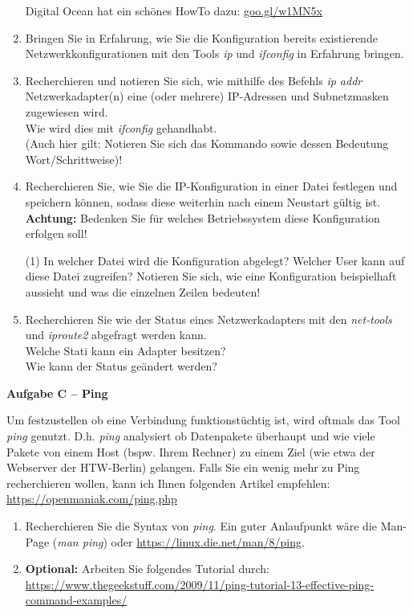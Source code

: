 \documentclass[paper=a4,fontsize=11pt]{scrartcl}%
\numberwithin{equation}{section}
\begin{document}
\begin{enumerate}
	Digital Ocean hat ein schönes HowTo dazu: \url{goo.gl/w1MN5x}
 	\item Bringen Sie in Erfahrung, wie Sie die Konfiguration bereits existierende Netzwerkkonfigurationen mit den Tools \emph{ip} und \emph{ifconfig} in Erfahrung bringen.
	\item Recherchieren und notieren Sie sich, wie mithilfe des Befehls \emph{ip addr} Netzwerkadapter(n) eine (oder mehrere) IP-Adressen und Subnetzmasken zugewiesen wird.\\
	Wie wird dies mit \emph{ifconfig} gehandhabt.\\
	(Auch hier gilt: Notieren Sie sich das Kommando sowie dessen Bedeutung Wort/Schrittweise)!
	\item Recherchieren Sie, wie Sie die IP-Konfiguration in einer Datei festlegen und speichern können, sodass diese weiterhin nach einem Neustart gültig ist.\\
	\textbf{Achtung:} Bedenken Sie für welches Betriebssystem diese Konfiguration erfolgen soll!
	\begin{tasks}(1)
		\task In welcher Datei wird die Konfiguration abgelegt?
		\task Welcher User kann auf diese Datei zugreifen?
		\task Notieren Sie sich, wie eine Konfiguration beispielhaft aussieht und was die einzelnen Zeilen bedeuten!
	\end{tasks}
	\item Recherchieren Sie wie der Status eines Netzwerkadapters mit den \emph{net-tools} und \emph{iproute2} abgefragt werden kann.\\
	Welche Stati kann ein Adapter besitzen?\\
	Wie kann der Status geändert werden?
\end{enumerate}

\begin{center}\Large{\textbf{Aufgabe C -- Ping}}\end{center}\vskip0.25in
Um festzustellen ob eine Verbindung funktionstüchtig ist, wird oftmals das Tool \emph{ping} genutzt. D.h. \emph{ping} analysiert ob Datenpakete überhaupt und wie viele Pakete von einem Host (bspw. Ihrem Rechner) zu einem Ziel (wie etwa der Webserver der HTW-Berlin) gelangen. Falls Sie ein wenig mehr zu Ping recherchieren wollen, kann ich Ihnen folgenden Artikel empfehlen: \url{https://openmaniak.com/ping.php}
\begin{enumerate}
	\item Recherchieren Sie die Syntax von \emph{ping}. Ein guter Anlaufpunkt wäre die Man-Page (\emph{man ping}) oder \url{https://linux.die.net/man/8/ping}.
	\item \textbf{Optional:} Arbeiten Sie folgendes Tutorial durch: \url{https://www.thegeekstuff.com/2009/11/ping-tutorial-13-effective-ping-command-examples/}
\end{enumerate}
\end{document}

